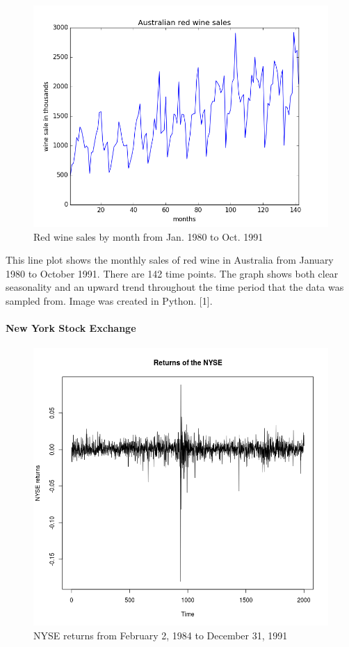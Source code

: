 \documentclass[12pt,a4paper]{article}
\begin{document}
\begin{figure}[h]
	\centering
	\includegraphics[scale = 0.5]{01_redwine.png}
	\caption{Red wine sales by month from Jan. 1980 to Oct. 1991}
	\label{fig:01_redwine}
\end{figure}

This line plot shows the monthly sales of red wine in Australia from January 1980 to October 1991. There are 142 time points. The graph shows both clear seasonality and an upward trend throughout the time period that the data was sampled from. Image was created in Python. [1].

\paragraph{New York Stock Exchange}

\begin{figure}[h]
	\centering
	\includegraphics[scale = 0.5]{01_NYSE.png}
	\caption{NYSE returns from February 2, 1984 to December 31, 1991}
	\label{fig:01_NYSE}
\end{figure}
\end{document}
